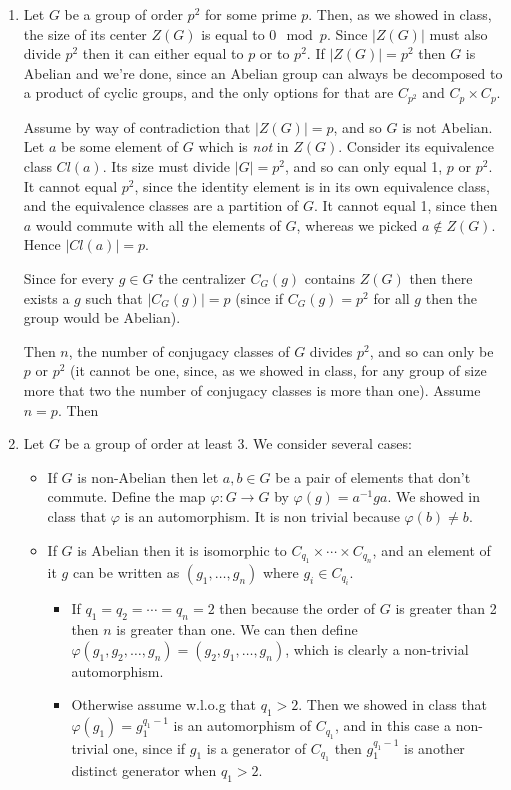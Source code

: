 \documentclass[11pt]{article} \usepackage{amssymb}
\renewcommand{\phi}{\varphi}
\begin{document}
\begin{enumerate}
\item
  Let $G$ be a group of order $p^2$ for some prime $p$. Then, as we showed in class,
  the size of its center $Z(G)$ is equal to $0\mod p$. Since $|Z(G)|$ must also
  divide $p^2$ then it can either equal to $p$ or to $p^2$. If $|Z(G)|=p^2$ then
  $G$ is Abelian and we're done, since an Abelian group can always be 
  decomposed to a product of cyclic groups, and the only options for that 
  are $C_{p^2}$ and $C_p \times C_p$.

  Assume by way of contradiction that $|Z(G)|=p$, and so $G$ is not Abelian.
  Let $a$ be some element of $G$ which is {\em not} in $Z(G)$. Consider
  its equivalence class $Cl(a)$. Its size must divide $|G|=p^2$, and so can 
  only equal 1, $p$ or $p^2$. It cannot equal $p^2$, since the identity
  element is in its own equivalence class, and the equivalence classes are
  a partition of $G$. It cannot equal 1, since then $a$ would commute with
  all the elements of $G$, whereas we picked $a \not \in Z(G)$. Hence
  $|Cl(a)|=p$. 


 Since for every $g \in G$
  the centralizer $C_G(g)$ contains $Z(G)$ then there exists a $g$ such that
  $|C_G(g)|=p$ (since if $C_G(g)=p^2$ for all $g$ then the group would be 
  Abelian).

 Then $n$, the number of
  conjugacy classes of $G$ divides $p^2$, and so can only be $p$ or
  $p^2$ (it cannot be one, since, as we showed in class, for any group of size
  more that two the number
  of conjugacy classes is more than one). Assume $n=p$. Then 

\item
  Let $G$ be a group of order at least 3. We consider several cases:
  \begin{itemize}
  \item 
    If $G$ is non-Abelian then let
    $a,b \in G$ be a pair of elements that don't commute. Define the map
    $\phi:G \to G$ by $\phi(g)=a^{-1}ga$. We showed in class that $\phi$ is an
    automorphism. It is non trivial because $\phi(b) \neq b$.
  \item
    If $G$ is Abelian then  it is isomorphic to 
    $C_{q_1} \times \cdots \times C_{q_n}$,
    and an element of it $g$ can be written as $(g_1,\ldots,g_n)$ where 
    $g_i \in C_{q_i}$. 
    \begin{itemize}
    \item 
      If $q_1=q_2=\cdots=q_n=2$ then because the order of $G$ is greater than 2 then
      $n$ is greater than one. We can then define 
      $\phi(g_1,g_2,\ldots,g_n)=(g_2,g_1,\ldots,g_n)$, which is clearly a 
      non-trivial automorphism. 
    \item 
      Otherwise assume w.l.o.g that $q_1>2$. Then we showed in class that
      $\phi(g_1)=g_1^{q_1-1}$ is an automorphism of $C_{q_1}$, and in this case a 
      non-trivial one, since if $g_1$ is a generator of $C_{q_1}$ then 
      $g_1^{q_1-1}$ is another distinct generator when $q_1>2$.


\end{itemize}
\end{itemize}
\end{enumerate}
\end{document}
